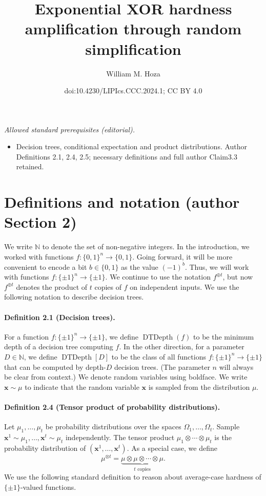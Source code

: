 \documentclass[10pt,a4paper]{article}
\title{Exponential XOR hardness amplification through random simplification}
\author{William M. Hoza}
\date{doi:10.4230/LIPIcs.CCC.2024.1; CC BY 4.0}
\newcommand{\DT}{\operatorname{DTDepth}}
\begin{document}
\maketitle
\noindent\textit{Allowed standard prerequisites (editorial).}\begin{itemize}
\item Decision trees, conditional expectation and product distributions. Author Definitions 2.1, 2.4, 2.5; necessary definitions and full author Claim3.3 retained.
\end{itemize}\medskip
\section*{Definitions and notation (author Section 2)}
We write $\mathbb N$ to denote the set of non-negative integers.
In the introduction, we worked with functions $f:\{0,1\}^n\to\{0,1\}$. Going forward, it will be more convenient to encode a bit $b\in\{0,1\}$ as the value $(-1)^b$. Thus, we will work with functions $f:\{\pm1\}^n\to\{\pm1\}$. We continue to use the notation $f^{\oplus t}$, but now $f^{\oplus t}$ denotes the product of $t$ copies of $f$ on independent inputs.
We use the following notation to describe decision trees.
\paragraph{Definition 2.1 (Decision trees).} For a function $f:\{\pm1\}^n\to\{\pm1\}$, we define $\DT(f)$ to be the minimum depth of a decision tree computing $f$. In the other direction, for a parameter $D\in\mathbb N$, we define $\DT[D]$ to be the class of all functions $f:\{\pm1\}^n\to\{\pm1\}$ that can be computed by depth-$D$ decision trees. (The parameter $n$ will always be clear from context.)
We denote random variables using boldface. We write $\mathbf x\sim\mu$ to indicate that the random variable $\mathbf x$ is sampled from the distribution $\mu$.
\paragraph{Definition 2.4 (Tensor product of probability distributions).} Let $\mu_1,\ldots,\mu_t$ be probability distributions over the spaces $\Omega_1,\ldots,\Omega_t$. Sample $\mathbf x^1\sim\mu_1,\ldots,\mathbf x^t\sim\mu_t$ independently. The tensor product $\mu_1\otimes\cdots\otimes\mu_t$ is the probability distribution of $(\mathbf x^1,\ldots,\mathbf x^t)$. As a special case, we define
\[\mu^{\otimes t}=\underbrace{\mu\otimes\mu\otimes\cdots\otimes\mu}_{t\text{ copies}}.\]
We use the following standard definition to reason about average-case hardness of $\{\pm1\}$-valued functions.
\end{document}
